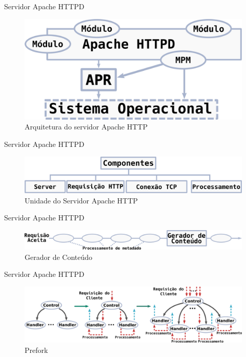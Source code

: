 \documentclass[xcolor={usenames,svgnames,dvipsnames},brazil,english,12pt,aspectratio=149]{beamer}
\begin{document}
\begin{frame}{Servidor Apache HTTPD}
  \begin{figure}[!h]
    \centering
    \includegraphics[width=\textwidth]{apache_arhitecture} 
    \caption*{Arquitetura do servidor Apache HTTP}
  \end{figure}
\end{frame}

\begin{frame}{Servidor Apache HTTPD}
  \begin{figure}[!h]
    \centering
    \includegraphics[width=\textwidth]{units} 
    \caption*{Unidade do Servidor Apache HTTP}
  \end{figure}
\end{frame}

\begin{frame}{Servidor Apache HTTPD}
  \begin{figure}[!h]
    \centering
    \includegraphics[width=\textwidth]{request_phases} 
    \caption*{Gerador de Conteúdo}
  \end{figure}
\end{frame}

\begin{frame}{Servidor Apache HTTPD}
  \begin{figure}[!h]
    \centering
    \includegraphics[width=\textwidth]{prefork} 
    \caption*{Prefork}
  \end{figure}
\end{frame}
\end{document}
